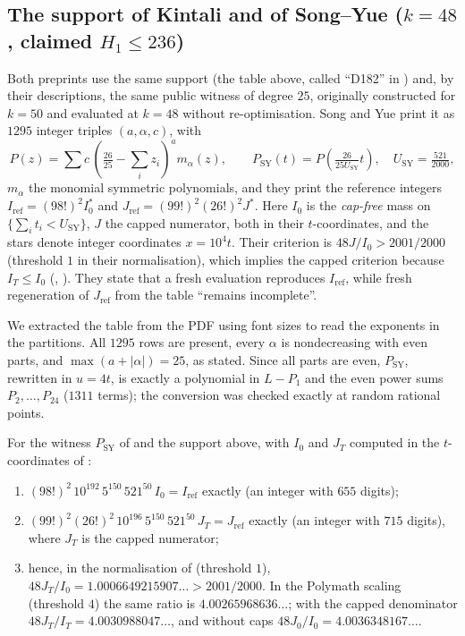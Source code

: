 \subsection*{The support of Kintali and of Song--Yue ($k=48$, claimed $H_1\le236$)}
Both preprints use the same support (the table above, called ``D182'' in
\cite{Kin26}) and, by their descriptions, the same public witness of degree
$25$, originally constructed for $k=50$ and evaluated at $k=48$ without
re-optimisation. Song and Yue print it as $1295$ integer triples
$(a,\alpha,c)$, with
\[
P(z)=\sum c\,\left(\tfrac{26}{25}-\textstyle\sum_iz_i\right)^a m_\alpha(z),\qquad
P_{\mathrm{SY}}(t)=P\!\left(\tfrac{26}{25U_{\mathrm{SY}}}t\right),\quad U_{\mathrm{SY}}=\tfrac{521}{2000},
\]
$m_\alpha$ the monomial symmetric polynomials, and they print the reference
integers $I_{\mathrm{ref}}=(98!)^2I_0^\ast$ and
$J_{\mathrm{ref}}=(99!)^2(26!)^2J^\ast$. Here $I_0$ is the \emph{cap-free} mass
on $\{\sum_it_i<U_{\mathrm{SY}}\}$, $J$ the capped numerator, both in their
$t$-coordinates, and the stars denote integer
coordinates $x=10^4t$. Their criterion is $48J/I_0>2001/2000$ (threshold $1$
in their normalisation), which implies
the capped criterion because $I_T\le I_0$ (,
\cite[\S4.12, App.~A, App.~C]{SY26}). They state that a fresh evaluation
reproduces $I_{\mathrm{ref}}$, while fresh regeneration of $J_{\mathrm{ref}}$
from the table ``remains incomplete''.

We extracted the table from the PDF using font sizes to read the exponents in
the partitions. All $1295$ rows are present, every $\alpha$ is nondecreasing
with even parts, and $\max(a+|\alpha|)=25$, as stated. Since all parts are
even, $P_{\mathrm{SY}}$, rewritten in $u=4t$, is exactly a polynomial in $L-P_1$ and the even power sums
$P_2,\dots,P_{24}$ ($1311$ terms); the conversion was checked exactly at random
rational points.

\begin{theorem}\label{thm:sy}
For the witness $P_{\mathrm{SY}}$ of \cite{SY26} and the support above, with
$I_0$ and $J_T$ computed in the $t$-coordinates of \cite{SY26}:
\begin{enumerate}
\item $(98!)^2\,10^{192}\,5^{150}\,521^{50}\,I_0=I_{\mathrm{ref}}$ exactly
(an integer with $655$ digits);
\item $(99!)^2(26!)^2\,10^{196}\,5^{150}\,521^{50}\,J_T=J_{\mathrm{ref}}$
exactly (an integer with $715$ digits), where $J_T$ is the capped numerator;
\item hence, in the normalisation of \cite{SY26} (threshold $1$),
$48J_T/I_0=1.0006649215907\ldots>2001/2000$. In the Polymath scaling
(threshold $4$) the same ratio is $4.00265968636\ldots$; with the capped
denominator $48J_T/I_T=4.0030988047\ldots$, and without caps
$48J_0/I_0=4.0036348167\ldots$.
\end{enumerate}
\end{theorem}

